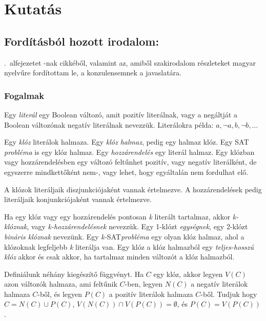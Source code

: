 \documentclass[
]{thesis-ekf}
\theoremstyle{definition}
\theoremstyle{remark}
\begin{document}
\chapter{Kutatás}
	\section{Fordításból hozott irodalom:}\label{sec-szakirodalom-forditas}
		
	\Az{\ref{ssec-fogalmak}}.~alfejezetet -nak cikkéből, valamint  az, amiből szakirodalom részleteket magyar nyelvűre fordítottam le, a konzulensemnek a javaslatára.
	
		\subsection{Fogalmak}\label{ssec-fogalmak}
	Egy \emph{literál} egy Boolean változó, amit pozitív literálnak, vagy a negáltját a Boolean változónak negatív literálnak nevezzük. Literálokra példa: $ a,\neg a,b,\neg b,\dots $
	
	Egy \emph{klóz} literálok halmaza. Egy \emph{klóz halmaz}, pedig egy halmaz klóz. Egy \textsc{SAT} \emph{probléma} is egy klóz halmaz. Egy \emph{hozzárendelés} egy literál halmaz. Egy klózban vagy hozzárendelésben egy változó feltűnhet pozitív, vagy negatív literálként, de egyszerre mindkettőként nem-, vagy lehet, hogy egyáltalán nem fordulhat elő.
	
	A klózok literáljaik diszjunkciójaként vannak értelmezve. A hozzárendelések pedig literáljaik konjunkciójaként vannak értelmezve.
	
	Ha egy klóz vagy egy hozzárendelés pontosan \emph{k} literált tartalmaz, akkor \emph{k-klóznak}, vagy \emph{k-hozzárendelésnek} nevezzük. Egy 1-klózt \emph{egységnek}, egy 2-klózt \emph{bináris klóznak} nevezünk. Egy \emph{k-}\textsc{SAT}\emph{probléma} egy olyan klóz halmaz, ahol a klózoknak legfeljebb \emph{k} literálja van. Egy klóz a klóz halmazból egy \emph{teljes-hosszú klóz} akkor és csak akkor, ha tartalmaz minden változót a klóz halmazból.
	
	Definiálunk néhány kiegészítő függvényt. Ha $ C $ egy klóz, akkor legyen $ V(C) $ azon változók halmaza, ami feltűnik $ C $-ben, legyen $ N(C) $ a negatív literálok halmaza $ C $-ből, és legyen $ P(C) $ a pozitív literálok halmaza $ C $-ből. Tudjuk hogy $ C=N(C)\cup P(C)$, $V(N(C))\cap V(P(C))=\emptyset $, és $ P(C)=V(P(C)) $.
	
\end{document}
